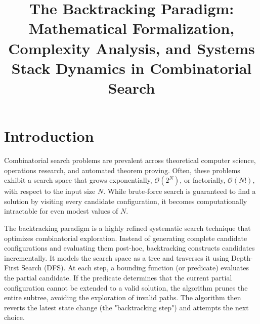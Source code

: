 \documentclass[10pt,journal,compsoc,onecolumn]{IEEEtran}
\begin{document}
\title{The Backtracking Paradigm: Mathematical Formalization, Complexity Analysis, and Systems Stack Dynamics in Combinatorial Search}


\maketitle
\IEEEdisplaynontitleabstractindextext
\IEEEpeerreviewmaketitle

\section{Introduction}
\label{sec:intro}

Combinatorial search problems are prevalent across theoretical computer science, operations research, and automated theorem proving. Often, these problems exhibit a search space that grows exponentially, $\mathcal{O}(2^N)$, or factorially, $\mathcal{O}(N!)$, with respect to the input size $N$. While brute-force search is guaranteed to find a solution by visiting every candidate configuration, it becomes computationally intractable for even modest values of $N$. 

The backtracking paradigm is a highly refined systematic search technique that optimizes combinatorial exploration. Instead of generating complete candidate configurations and evaluating them post-hoc, backtracking constructs candidates incrementally. It models the search space as a tree and traverses it using Depth-First Search (DFS). At each step, a bounding function (or predicate) evaluates the partial candidate. If the predicate determines that the current partial configuration cannot be extended to a valid solution, the algorithm prunes the entire subtree, avoiding the exploration of invalid paths. The algorithm then reverts the latest state change (the "backtracking step") and attempts the next choice.
\end{document}
